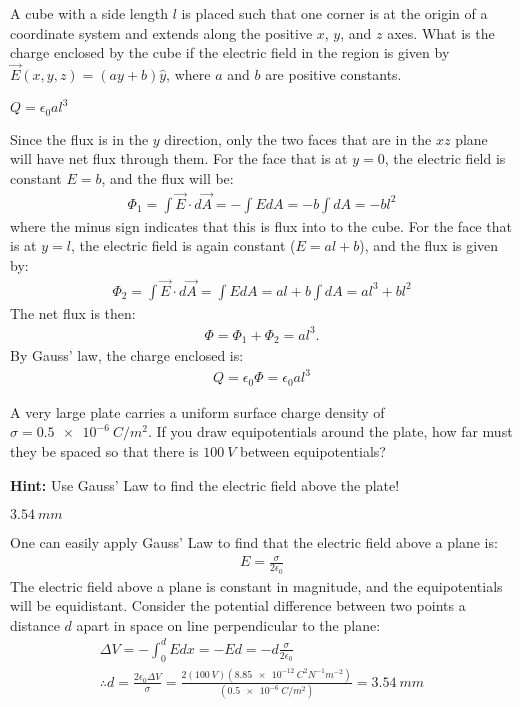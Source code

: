\question A cube with a side length $l$ is placed such that one corner is at the origin of a coordinate system and extends along the positive $x$, $y$, and $z$ axes. What is the charge enclosed by the cube if the electric field in the region is given by $\vec E(x,y,z)=(ay+b)\hat y$, where $a$ and $b$ are positive constants.
\begin{finalanswer}
$Q=\epsilon_0al^3$
\end{finalanswer}
\begin{solution}
Since the flux is in the $y$ direction, only the two faces that are in the $xz$ plane will have net flux through them. For the face that is at $y=0$, the electric field is constant $E=b$, and the flux will be:
\begin{align*}
\Phi_1=\int \vec E\cdot d\vec A=-\int EdA=-b\int dA=-bl^2
\end{align*}
where the minus sign indicates that this is flux into to the cube. For the face that is at $y=l$, the electric field is again constant ($E=al+b$), and the flux is given by:
\begin{align*}
\Phi_2=\int \vec E\cdot d\vec A=\int EdA=al+b\int dA=al^3+bl^2
\end{align*}
The net flux is then:
\begin{align*}
\Phi=\Phi_1+\Phi_2=al^3.
\end{align*}
By Gauss' law, the charge enclosed is:
\begin{align*}
Q=\epsilon_0\Phi=\epsilon_0al^3
\end{align*}
\end{solution}

\question A very large plate carries a uniform surface charge density of $\sigma=\SI{0.5e-6}{C/m^2}$. If you draw equipotentials around the plate, how far must they be spaced so that there is $\SI{100}{V}$ between equipotentials?

\textbf{Hint:} Use Gauss' Law to find the electric field above the plate!
\begin{finalanswer}
	$\SI{3.54}{mm}$
\end{finalanswer}
\begin{solution}
	One can easily apply Gauss' Law to find that the electric field above a plane is:
	\begin{align*}
	E=\frac{\sigma}{2\epsilon_0}
	\end{align*}
	The electric field above a plane is constant in magnitude, and the equipotentials will be equidistant. Consider the potential difference between two points a distance $d$ apart in space on line perpendicular to the plane:
	\begin{align*}
	\Delta V=-\int_0^d Edx = -Ed=-d\frac{\sigma}{2\epsilon_0}\\
	\therefore d = \frac{2\epsilon_0\Delta V}{\sigma}=\frac{2(\SI{100}{V})(\SI{8.85e-12}{C^2N^{-1}m^{-2}})}{(\SI{0.5e-6}{C/m^2})}=\SI{3.54}{mm}
	\end{align*}
\end{solution}


